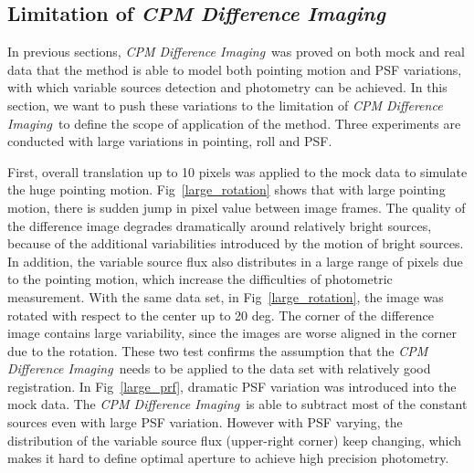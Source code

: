 \documentclass[12pt, preprint]{aastex}
\newcommand{\project}[1]{\textsl{#1}}
\newcommand{\cpmdiff}{\project{CPM Difference Imaging}}
\begin{document}
\subsection{Limitation of \cpmdiff}
In previous sections,  \cpmdiff\ was proved on both mock and real data that the method is able to model both pointing motion and PSF variations, with which variable sources detection and photometry can be achieved.
In this section, we want to push these variations to the limitation of \cpmdiff\ to define the scope of application of the method. Three experiments are conducted with large variations in pointing, roll and PSF.

First, overall translation up to 10 pixels was applied to the mock data to simulate the huge pointing motion.   
Fig~\ref{large_rotation} shows that with large pointing motion, there is sudden jump in pixel value between image frames. 
The quality of the difference image degrades dramatically around relatively bright sources, because of the additional variabilities introduced by the motion of bright sources.
In addition,  the variable source flux also distributes in a large range of pixels due to the pointing motion, which increase the difficulties of photometric measurement.
With the same data set, in Fig~\ref{large_rotation}, the image was rotated with respect to the center up to 20 deg. 
The corner of the difference image contains large variability, since the images are worse aligned in the corner due to the rotation. 
These two test confirms the assumption that the \cpmdiff\ needs to be applied to the data set with relatively good registration.
In Fig~\ref{large_prf}, dramatic PSF variation was introduced into the mock data.
The \cpmdiff\ is able to subtract most of the constant sources even with large PSF variation. 
However with PSF varying, the distribution of the variable source flux (upper-right corner) keep changing, which makes it hard to define optimal aperture to achieve high precision photometry. 
\end{document}
